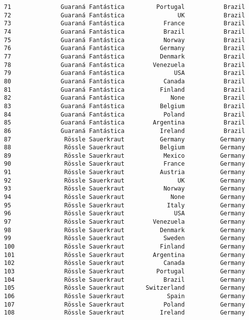 \documentclass[11pt]{article}
\begin{document}
\begin{tcolorbox}[breakable, size=fbox, boxrule=.5pt, pad at break*=1mm, opacityfill=0]
\begin{Verbatim}[commandchars=\\\{\}]
71              Guaraná Fantástica         Portugal           Brazil
72              Guaraná Fantástica               UK           Brazil
73              Guaraná Fantástica           France           Brazil
74              Guaraná Fantástica           Brazil           Brazil
75              Guaraná Fantástica           Norway           Brazil
76              Guaraná Fantástica          Germany           Brazil
77              Guaraná Fantástica          Denmark           Brazil
78              Guaraná Fantástica        Venezuela           Brazil
79              Guaraná Fantástica              USA           Brazil
80              Guaraná Fantástica           Canada           Brazil
81              Guaraná Fantástica          Finland           Brazil
82              Guaraná Fantástica             None           Brazil
83              Guaraná Fantástica          Belgium           Brazil
84              Guaraná Fantástica           Poland           Brazil
85              Guaraná Fantástica        Argentina           Brazil
86              Guaraná Fantástica          Ireland           Brazil
87               Rössle Sauerkraut          Germany          Germany
88               Rössle Sauerkraut          Belgium          Germany
89               Rössle Sauerkraut           Mexico          Germany
90               Rössle Sauerkraut           France          Germany
91               Rössle Sauerkraut          Austria          Germany
92               Rössle Sauerkraut               UK          Germany
93               Rössle Sauerkraut           Norway          Germany
94               Rössle Sauerkraut             None          Germany
95               Rössle Sauerkraut            Italy          Germany
96               Rössle Sauerkraut              USA          Germany
97               Rössle Sauerkraut        Venezuela          Germany
98               Rössle Sauerkraut          Denmark          Germany
99               Rössle Sauerkraut           Sweden          Germany
100              Rössle Sauerkraut          Finland          Germany
101              Rössle Sauerkraut        Argentina          Germany
102              Rössle Sauerkraut           Canada          Germany
103              Rössle Sauerkraut         Portugal          Germany
104              Rössle Sauerkraut           Brazil          Germany
105              Rössle Sauerkraut      Switzerland          Germany
106              Rössle Sauerkraut            Spain          Germany
107              Rössle Sauerkraut           Poland          Germany
108              Rössle Sauerkraut          Ireland          Germany

\end{Verbatim}
\end{tcolorbox}
\end{document}
